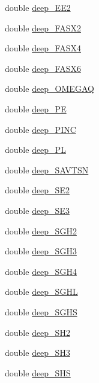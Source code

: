 \begin{DoxyCompactItemize}
double \hyperlink{structdeep__data_ad56e8a78d8e4b1e77212692466325ea0}{deep\-\_\-\-E\-E2}
\item 
double \hyperlink{structdeep__data_a6860682a1c0a1bd96a6da624e58904f2}{deep\-\_\-\-F\-A\-S\-X2}
\item 
double \hyperlink{structdeep__data_a8da5269a610ed64efdb20ec003cedfff}{deep\-\_\-\-F\-A\-S\-X4}
\item 
double \hyperlink{structdeep__data_a7a83916118009f55fd5a3110f27cfc92}{deep\-\_\-\-F\-A\-S\-X6}
\item 
double \hyperlink{structdeep__data_a781f41e5be1a7461d09595a9f40ea031}{deep\-\_\-\-O\-M\-E\-G\-A\-Q}
\item 
double \hyperlink{structdeep__data_ab1c261ff7f2453a8e7215c61feaf0805}{deep\-\_\-\-P\-E}
\item 
double \hyperlink{structdeep__data_af2f5e518e3f3fce54ed26609f3c79b54}{deep\-\_\-\-P\-I\-N\-C}
\item 
double \hyperlink{structdeep__data_a442dfa180943989c1f3846c653ccb6c5}{deep\-\_\-\-P\-L}
\item 
double \hyperlink{structdeep__data_a5af5606eb1bc9ec16c675f2fcb423876}{deep\-\_\-\-S\-A\-V\-T\-S\-N}
\item 
double \hyperlink{structdeep__data_a9826bc9dbad9a08ab78bdde4226f62a4}{deep\-\_\-\-S\-E2}
\item 
double \hyperlink{structdeep__data_a51943594c08af647dcc680856232f977}{deep\-\_\-\-S\-E3}
\item 
double \hyperlink{structdeep__data_a3dad09351712388de9c2535bd390306e}{deep\-\_\-\-S\-G\-H2}
\item 
double \hyperlink{structdeep__data_aa2d221ae5138c88af2f6bc6264bad6bb}{deep\-\_\-\-S\-G\-H3}
\item 
double \hyperlink{structdeep__data_a2995096073c3888a1822bfee3c5f890e}{deep\-\_\-\-S\-G\-H4}
\item 
double \hyperlink{structdeep__data_ae984a8c27a04f6825c4807bc1770152b}{deep\-\_\-\-S\-G\-H\-L}
\item 
double \hyperlink{structdeep__data_a18636737b0c3986d3880001368545e81}{deep\-\_\-\-S\-G\-H\-S}
\item 
double \hyperlink{structdeep__data_adb5e294c6e5cb72a46bea2c7ea935404}{deep\-\_\-\-S\-H2}
\item 
double \hyperlink{structdeep__data_a05cd2fb4785ea30938072931dd06bf0f}{deep\-\_\-\-S\-H3}
\item 
double \hyperlink{structdeep__data_a9fcfc26f321c9c3fd73b31e3572192af}{deep\-\_\-\-S\-H\-S}

\end{DoxyCompactItemize}
